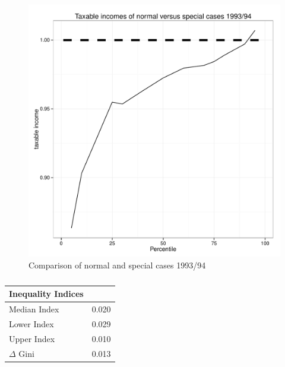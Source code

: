 \documentclass[twoside]{article}\usepackage[]{graphicx}\usepackage[]{color}
\makeatletter
\def\maxwidth{ %
  \ifdim\Gin@nat@width>\linewidth
    \linewidth
  \else
    \Gin@nat@width
  \fi
}
\newenvironment{knitrout}{}{} %
\makeatother
\begin{document}
\begin{multicols}{2}


\begin{knitrout}
\color{fgcolor}\begin{figure}[H]

\includegraphics[width=\maxwidth]{figure/specialcases9394} \caption[Comparison of normal and special cases 1993/94]{Comparison of normal and special cases 1993/94\label{fig:specialcases9394}}
\end{figure}


\end{knitrout}

\begin{table}[H]
\caption{\label{pol9394spec}} 
\begin{center}
\begin{tabular}{ll}
\hline\hline
\multicolumn{1}{l}{Inequality Indices}&\multicolumn{1}{c}{}\tabularnewline
\hline
Median Index&0.020\tabularnewline
Lower Index&0.029\tabularnewline
Upper Index&0.010\tabularnewline
$\Delta$ Gini&0.013\tabularnewline
\hline
\end{tabular}\end{center}


\end{table}
\end{multicols}
\end{document}
